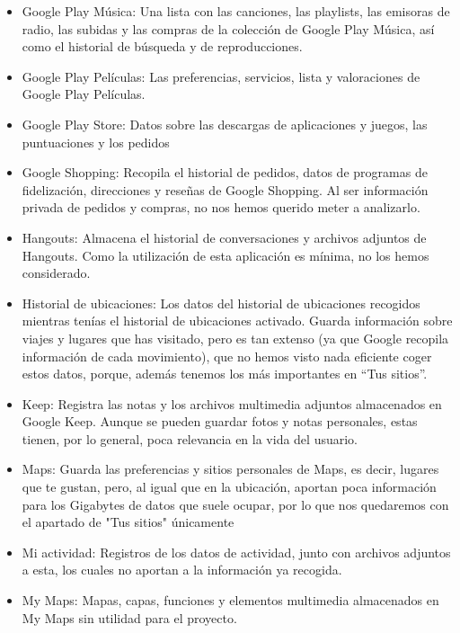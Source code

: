 \begin{itemize}
	\item Google Play Música: Una lista con las canciones, las playlists, las emisoras de radio, las subidas y las compras de la colección de Google Play Música, así como el historial de búsqueda y de reproducciones.
	
	\item Google Play Películas: Las preferencias, servicios, lista y valoraciones de Google Play Películas.
	
	\item Google Play Store: Datos sobre las descargas de aplicaciones y juegos, las puntuaciones y los pedidos
	
	\item Google Shopping: Recopila el historial de pedidos, datos de programas de fidelización, direcciones y reseñas de Google Shopping. Al ser información privada de pedidos y compras, no nos hemos querido meter a analizarlo.
	
	\item Hangouts: Almacena el historial de conversaciones y archivos adjuntos de Hangouts. Como la utilización de esta aplicación es mínima, no los hemos considerado.
	
	\item Historial de ubicaciones: Los datos del historial de ubicaciones recogidos mientras tenías el historial de ubicaciones activado. Guarda información sobre viajes y lugares que has visitado, pero es tan extenso (ya que Google recopila información de cada movimiento), que no hemos visto nada eficiente coger estos datos, porque, además tenemos los más importantes en ``Tus sitios''.
	
	\item Keep: Registra las notas y los archivos multimedia adjuntos almacenados en Google Keep. Aunque se pueden guardar fotos y notas personales, estas tienen, por lo general, poca relevancia en la vida del usuario.
	
	\item Maps: Guarda las preferencias y sitios personales de Maps, es decir, lugares que te gustan, pero, al igual que en la ubicación, aportan poca información para los Gigabytes de datos que suele ocupar, por lo que nos quedaremos con el apartado de "Tus sitios" únicamente
	
	\item Mi actividad: Registros de los datos de actividad, junto con archivos adjuntos a esta, los cuales no aportan a la información ya recogida.
	
	\item My Maps: Mapas, capas, funciones y elementos multimedia almacenados en My Maps sin utilidad para el proyecto.
	

\end{itemize}
